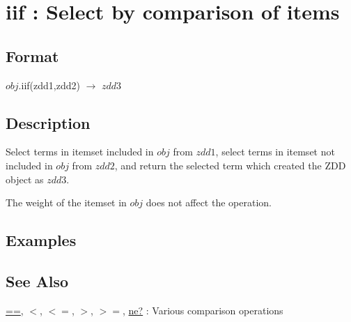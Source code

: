 
\section{iif : Select by comparison of items\label{sect:iif}}
\subsection*{Format}
$obj$.iif(zdd1,zdd2) $\rightarrow$ $zdd3$

\subsection*{Description}

Select terms in itemset included in $obj$ from $zdd1$, 
select terms in itemset not included in $obj$ from $zdd2$, 
and return the selected term which created the ZDD object as $zdd3$. 

The weight of the itemset in $obj$ does not affect the operation. 

\subsection*{Examples}


\subsection*{See Also}
\hyperref[sect:eq]{==},
\hyperref[sect:lt]{$<$},
\hyperref[sect:le]{$<=$},
\hyperref[sect:gt]{$>$},
\hyperref[sect:ge]{$>=$},
\hyperref[sect:ne]{ne?} : Various comparison operations 
